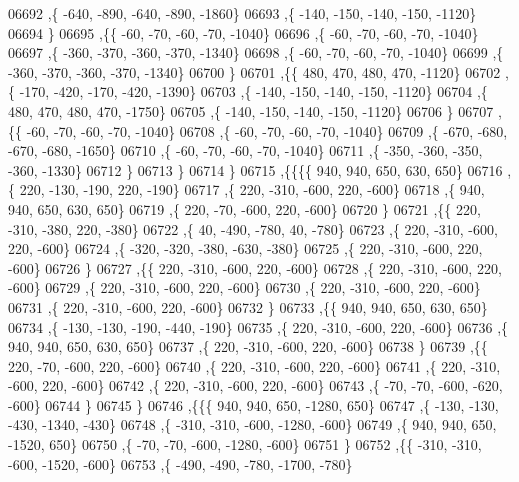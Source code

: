 \begin{DoxyCode}
06692     ,\{  -640,  -890,  -640,  -890, -1860\}
06693     ,\{  -140,  -150,  -140,  -150, -1120\}
06694     \}
06695    ,\{\{   -60,   -70,   -60,   -70, -1040\}
06696     ,\{   -60,   -70,   -60,   -70, -1040\}
06697     ,\{  -360,  -370,  -360,  -370, -1340\}
06698     ,\{   -60,   -70,   -60,   -70, -1040\}
06699     ,\{  -360,  -370,  -360,  -370, -1340\}
06700     \}
06701    ,\{\{   480,   470,   480,   470, -1120\}
06702     ,\{  -170,  -420,  -170,  -420, -1390\}
06703     ,\{  -140,  -150,  -140,  -150, -1120\}
06704     ,\{   480,   470,   480,   470, -1750\}
06705     ,\{  -140,  -150,  -140,  -150, -1120\}
06706     \}
06707    ,\{\{   -60,   -70,   -60,   -70, -1040\}
06708     ,\{   -60,   -70,   -60,   -70, -1040\}
06709     ,\{  -670,  -680,  -670,  -680, -1650\}
06710     ,\{   -60,   -70,   -60,   -70, -1040\}
06711     ,\{  -350,  -360,  -350,  -360, -1330\}
06712     \}
06713    \}
06714   \}
06715  ,\{\{\{\{   940,   940,   650,   630,   650\}
06716     ,\{   220,  -130,  -190,   220,  -190\}
06717     ,\{   220,  -310,  -600,   220,  -600\}
06718     ,\{   940,   940,   650,   630,   650\}
06719     ,\{   220,   -70,  -600,   220,  -600\}
06720     \}
06721    ,\{\{   220,  -310,  -380,   220,  -380\}
06722     ,\{    40,  -490,  -780,    40,  -780\}
06723     ,\{   220,  -310,  -600,   220,  -600\}
06724     ,\{  -320,  -320,  -380,  -630,  -380\}
06725     ,\{   220,  -310,  -600,   220,  -600\}
06726     \}
06727    ,\{\{   220,  -310,  -600,   220,  -600\}
06728     ,\{   220,  -310,  -600,   220,  -600\}
06729     ,\{   220,  -310,  -600,   220,  -600\}
06730     ,\{   220,  -310,  -600,   220,  -600\}
06731     ,\{   220,  -310,  -600,   220,  -600\}
06732     \}
06733    ,\{\{   940,   940,   650,   630,   650\}
06734     ,\{  -130,  -130,  -190,  -440,  -190\}
06735     ,\{   220,  -310,  -600,   220,  -600\}
06736     ,\{   940,   940,   650,   630,   650\}
06737     ,\{   220,  -310,  -600,   220,  -600\}
06738     \}
06739    ,\{\{   220,   -70,  -600,   220,  -600\}
06740     ,\{   220,  -310,  -600,   220,  -600\}
06741     ,\{   220,  -310,  -600,   220,  -600\}
06742     ,\{   220,  -310,  -600,   220,  -600\}
06743     ,\{   -70,   -70,  -600,  -620,  -600\}
06744     \}
06745    \}
06746   ,\{\{\{   940,   940,   650, -1280,   650\}
06747     ,\{  -130,  -130,  -430, -1340,  -430\}
06748     ,\{  -310,  -310,  -600, -1280,  -600\}
06749     ,\{   940,   940,   650, -1520,   650\}
06750     ,\{   -70,   -70,  -600, -1280,  -600\}
06751     \}
06752    ,\{\{  -310,  -310,  -600, -1520,  -600\}
06753     ,\{  -490,  -490,  -780, -1700,  -780\}

\end{DoxyCode}

